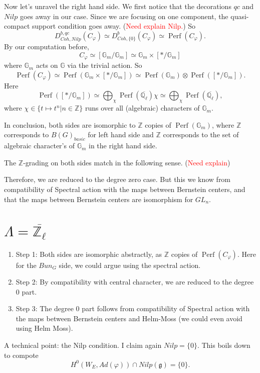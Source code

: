 \documentclass{article}
\newcommand{\red}[1]{\textcolor{red}{#1}}
\newcommand{\Perf}{\operatorname{Perf}}
\begin{document}
	Now let's unravel the right hand side. We first notice that the decorations $qc$ and $Nilp$ goes away in our case. Since we are focusing on one component, the quasi-compact support condition goes away. (\red{Need explain Nilp.}) So 
	$$D^{b, qc}_{Coh, Nilp}(C_{\varphi}) \simeq D^b_{Coh, \{0\}}(C_{\varphi}) \simeq \Perf(C_{\varphi}).$$
	By our computation before,
	$$C_{\varphi} \simeq [\mathbb{G}_m/\mathbb{G}_m] \simeq \mathbb{G}_m \times [*/\mathbb{G}_m]$$
	where $\mathbb{G}_m$ acts on $\mathbb{G}$ via the trivial action. So
	$$\Perf(C_{\varphi}) \simeq \Perf(\mathbb{G}_m \times [*/\mathbb{G}_m]) \simeq \Perf(\mathbb{G}_m) \otimes \Perf([*/\mathbb{G}_m]).$$
	Here 
	$$\Perf([*/\mathbb{G}_m]) \simeq \bigoplus_{\chi}\Perf(\overline{\mathbb{Q}_{\ell}})\chi \simeq \bigoplus_{\chi}\Perf(\overline{\mathbb{Q}_{\ell}}),$$
	where $\chi \in \{t \mapsto t^n | n \in \mathbb{Z}\}$ runs over all (algebraic) characters of $\mathbb{G}_m$.
	
	In conclusion, both sides are isomorphic to $\mathbb{Z}$ copies of $\Perf(\mathbb{G}_m)$, where $\mathbb{Z}$ corresponds to $B(G)_{basic}$ for left hand side and $\mathbb{Z}$ corresponds to the set of algebraic character's of $\mathbb{G}_m$ in the right hand side.
	
	The $\mathbb{Z}$-grading on both sides match in the following sense. (\red{Need explain})
	
	Therefore, we are reduced to the degree zero case. But this we know from compatibility of Spectral action with the maps between Bernstein centers, and that the maps between Bernstein centers are isomorphism for $GL_n$.
	
	
	\section{$\Lambda=\overline{\mathbb{Z}_{\ell}}$}
	\begin{enumerate}
		\item Step 1: Both sides are isomorphic abstractly, as $\mathbb{Z}$ copies of $\Perf(C_{\varphi})$. Here for the $Bun_G$ side, we could argue using the spectral action.
	    \item Step 2: By compatibility with central character, we are reduced to the degree $0$ part.
	    \item Step 3: The degree $0$ part follows from compatibility of Spectral action with the maps between Bernstein centers and Helm-Moss (we could even avoid using Helm Moss).
	\end{enumerate}

    A technical point: the Nilp condition. I claim again $Nilp=\{0\}$. This boils down to compote 
    $$H^0(W_E, Ad(\varphi)) \cap Nilp(\mathfrak{g})=\{0\}.$$
	

	
	


\end{document}

